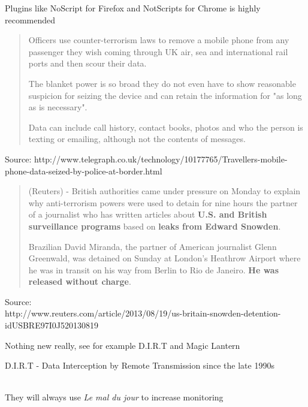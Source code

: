 \documentclass[20pt,landscape,a4paper,footrule]{foils}
\begin{document}
Plugins like NoScript for Firefox and NotScripts for Chrome is highly recommended


\begin{quote}
Officers use counter-terrorism laws to remove a mobile phone from any passenger they wish coming through UK air, sea and international rail ports and then scour their data.

The blanket power is so broad they do not even have to show reasonable suspicion for seizing the device and can retain the information for "as long as is necessary".

Data can include call history, contact books, photos and who the person is texting or emailing, although not the contents of messages.
\end{quote}


{\small Source:
http://www.telegraph.co.uk/technology/10177765/Travellers-mobile-phone-data-seized-by-police-at-border.html}



\begin{quote}
(Reuters) - British authorities came under pressure on Monday to explain why anti-terrorism powers were used to detain for nine hours the partner of a journalist who has written articles about {\bf U.S. and British surveillance programs} based on {\bf leaks from Edward Snowden}.

Brazilian David Miranda, the partner of American journalist Glenn Greenwald, was detained on Sunday at London's Heathrow Airport where he was in transit on his way from Berlin to Rio de Janeiro. {\bf He was released without charge}.
\end{quote}

{\small Source:\\
{http://www.reuters.com/article/2013/08/19/us-britain-snowden-detention-idUSBRE97I0J520130819}}



\begin{list1}
\item Nothing new really, see for example D.I.R.T and Magic Lantern
\item D.I.R.T - Data Interception by Remote Transmission since the late 1990s\\
\\

\item They will always use \emph{Le mal du jour} to increase monitoring
\end{list1}
\end{document}
